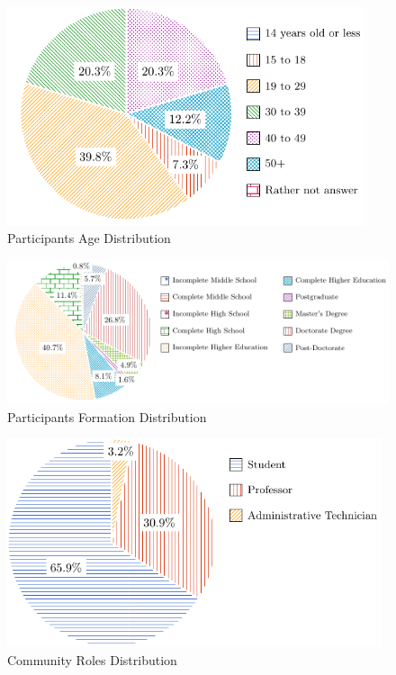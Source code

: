 \begin{figure}[!htb]
  \caption{Participants Age Distribution}\label{fig:age-distribution}
  \begin{center}
    \includegraphics[width=10.5cm]{img/5-participants-age.pdf}
  \end{center}
\end{figure}

\begin{figure}[!htb]
  \caption{Participants Formation Distribution}\label{fig:formation-distribution}
  \begin{center}
    \includegraphics[width=17cm]{img/5-participants-formation.pdf}
  \end{center}
\end{figure}

\begin{figure}[!htb]
  \caption{Community Roles Distribution}\label{fig:community-roles}
  \begin{center}
    \includegraphics[width=11cm]{img/5-community-roles.pdf}
  \end{center}
\end{figure}

